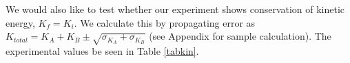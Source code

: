 \documentclass[11pt]{article}
\begin{document}
\begin{figure}[!h]
   \begin{floatrow}
   \end{floatrow}
\end{figure}

We would also like to test whether our experiment shows conservation of kinetic energy, $K_f = K_i$. We calculate this by propagating error as $K_{total} = K_A+K_B \pm \sqrt{\sigma_{K_A}+\sigma_{K_B}}$ (see Appendix for sample calculation). The experimental values be seen in Table \ref{tabkin}.
\end{document}
